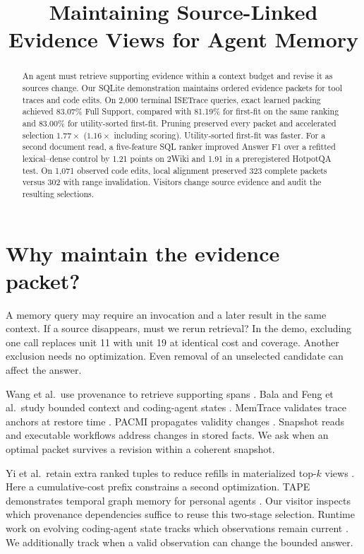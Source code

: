 \documentclass[conference]{IEEEtran}
\title{Maintaining Source-Linked Evidence Views for Agent Memory}
\author{\IEEEauthorblockN{Anonymous authors}}
\begin{document}
\maketitle
\begin{abstract}
An agent must retrieve supporting evidence within a context budget and revise it as sources change. Our SQLite demonstration maintains ordered evidence packets for tool traces and code edits. On 2,000 terminal ISETrace queries, exact learned packing achieved 83.07\% Full Support, compared with 81.19\% for first-fit on the same ranking and 83.00\% for utility-sorted first-fit. Pruning preserved every packet and accelerated selection $1.77\times$ ($1.16\times$ including scoring). Utility-sorted first-fit was faster. For a second document read, a five-feature SQL ranker improved Answer F1 over a refitted lexical--dense control by 1.21 points on 2Wiki and 1.91 in a preregistered HotpotQA test. On 1,071 observed code edits, local alignment preserved 323 complete packets versus 302 with range invalidation. Visitors change source evidence and audit the resulting selections.

\end{abstract}

\section{Why maintain the evidence packet?}

A memory query may require an invocation and a later result in the same context. If a source disappears, must we rerun retrieval? In the demo, excluding one call replaces unit 11 with unit 19 at identical cost and coverage. Another exclusion needs no optimization. Even removal of an unselected candidate can affect the answer.

Wang et al.\ use provenance to retrieve supporting spans \cite{wang}. Bala and Feng et al.\ study bounded context and coding-agent states \cite{bala,feng}. MemTrace validates trace anchors at restore time \cite{memtrace}. PACMI propagates validity changes \cite{pacmi}. Snapshot reads \cite{readboundaries} and executable workflows \cite{changes} address changes in stored facts. We ask when an optimal packet survives a revision within a coherent snapshot.

Yi et al.\ retain extra ranked tuples to reduce refills in materialized top-$k$ views \cite{topk}. Here a cumulative-cost prefix constrains a second optimization. TAPE demonstrates temporal graph memory for personal agents \cite{tape}. Our visitor inspects which provenance dependencies suffice to reuse this two-stage selection. Runtime work on evolving coding-agent state tracks which observations remain current \cite{execledger}. We additionally track when a valid observation can change the bounded answer.
\end{document}
